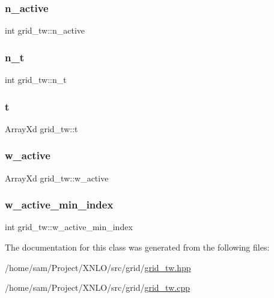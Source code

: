 \subsubsection{\texorpdfstring{n\_active}{n\_active}}
{\footnotesize\ttfamily int grid\+\_\+tw\+::n\+\_\+active}

\mbox{\label{classgrid__tw_ac121ce740479f628bdaa54627540ad42}} 
\subsubsection{\texorpdfstring{n\_t}{n\_t}}
{\footnotesize\ttfamily int grid\+\_\+tw\+::n\+\_\+t}

\mbox{\label{classgrid__tw_a918f1e6d18056d0f6da08fe01089b9b0}} 
\subsubsection{\texorpdfstring{t}{t}}
{\footnotesize\ttfamily Array\+Xd grid\+\_\+tw\+::t}

\mbox{\label{classgrid__tw_a66922766c9dfe5c4667e55e678b134b9}} 
\subsubsection{\texorpdfstring{w\_active}{w\_active}}
{\footnotesize\ttfamily Array\+Xd grid\+\_\+tw\+::w\+\_\+active}

\mbox{\label{classgrid__tw_a27d987fb3c8cbacf9cd152b83477f0d9}} 
\subsubsection{\texorpdfstring{w\_active\_min\_index}{w\_active\_min\_index}}
{\footnotesize\ttfamily int grid\+\_\+tw\+::w\+\_\+active\+\_\+min\+\_\+index}



The documentation for this class was generated from the following files\+:\begin{DoxyCompactItemize}
\item 
/home/sam/\+Project/\+X\+N\+L\+O/src/grid/\mbox{\hyperlink{grid__tw_8hpp}{grid\+\_\+tw.\+hpp}}\item 
/home/sam/\+Project/\+X\+N\+L\+O/src/grid/\mbox{\hyperlink{grid__tw_8cpp}{grid\+\_\+tw.\+cpp}}\end{DoxyCompactItemize}
